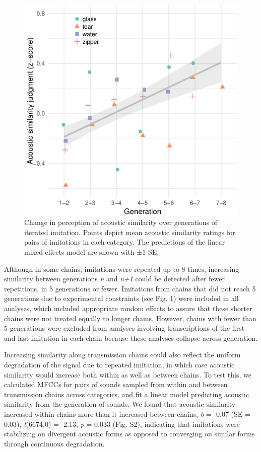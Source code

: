 \documentclass[english,floatsintext,man]{apa6}
\theoremstyle{definition}
\theoremstyle{definition}
\theoremstyle{definition}
\theoremstyle{remark}
\begin{document}
\begin{figure}
\centering
\includegraphics{fig2-1.pdf}
\caption{\label{fig:fig2}Change in perception of acoustic similarity over
generations of iterated imitation. Points depict mean acoustic
similarity ratings for pairs of imitations in each category. The
predictions of the linear mixed-effects model are shown with ±1 SE.}
\end{figure}

Although in some chains, imitations were repeated up to 8 times,
increasing similarity between generations \emph{n} and \emph{n+1} could
be detected after fewer repetitions, in 5 generations or fewer.
Imitations from chains that did not reach 5 generations due to
experimental constraints (see Fig. 1) were included in all analyses,
which included appropriate random effects to assure that these shorter
chains were not treated equally to longer chains. However, chains with
fewer than 5 generations were excluded from analyses involving
transcriptions of the first and last imitation in each chain because
these analyses collapse across generation.

Increasing similarity along transmission chains could also reflect the
uniform degradation of the signal due to repeated imitation, in which
case acoustic similarity would increase both within as well as between
chains. To test this, we calculated MFCCs for pairs of sounds sampled
from within and between transmission chains across categories, and fit a
linear model predicting acoustic similarity from the generation of
sounds. We found that acoustic similarity increased within chains more
than it increased between chains, \emph{b} = -0.07 (SE = 0.03),
\emph{t}(6674.0) = -2.13, \emph{p} = 0.033 (Fig. S2), indicating that
imitations were stabilizing on divergent acoustic forms as opposed to
converging on similar forms through continuous degradation.
\end{document}
